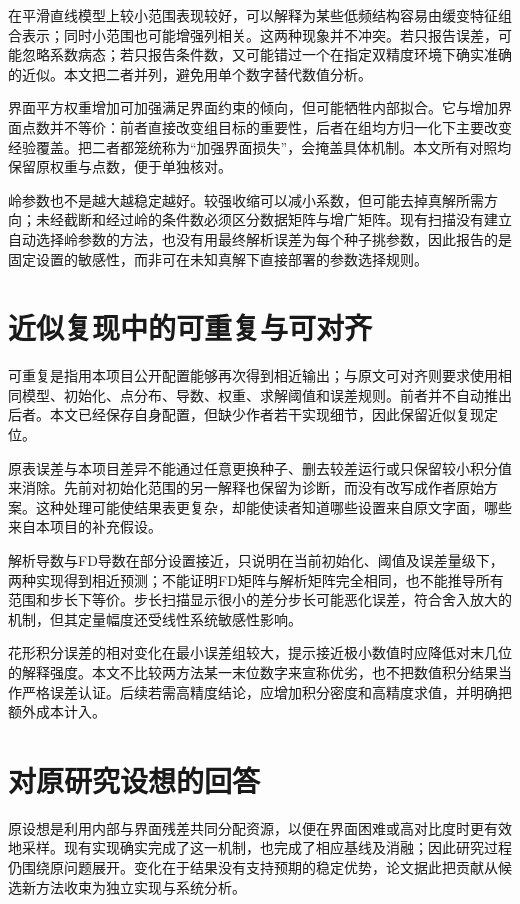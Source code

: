 在平滑直线模型上较小范围表现较好，可以解释为某些低频结构容易由缓变特征组合表示；同时小范围也可能增强列相关。这两种现象并不冲突。若只报告误差，可能忽略系数病态；若只报告条件数，又可能错过一个在指定双精度环境下确实准确的近似。本文把二者并列，避免用单个数字替代数值分析。

界面平方权重增加可加强满足界面约束的倾向，但可能牺牲内部拟合。它与增加界面点数并不等价：前者直接改变组目标的重要性，后者在组均方归一化下主要改变经验覆盖。把二者都笼统称为“加强界面损失”，会掩盖具体机制。本文所有对照均保留原权重与点数，便于单独核对。

岭参数也不是越大越稳定越好。较强收缩可以减小系数，但可能去掉真解所需方向；未经截断和经过岭的条件数必须区分数据矩阵与增广矩阵。现有扫描没有建立自动选择岭参数的方法，也没有用最终解析误差为每个种子挑参数，因此报告的是固定设置的敏感性，而非可在未知真解下直接部署的参数选择规则。

\section{近似复现中的可重复与可对齐}
可重复是指用本项目公开配置能够再次得到相近输出；与原文可对齐则要求使用相同模型、初始化、点分布、导数、权重、求解阈值和误差规则。前者并不自动推出后者。本文已经保存自身配置，但缺少作者若干实现细节，因此保留近似复现定位。

原表误差与本项目差异不能通过任意更换种子、删去较差运行或只保留较小积分值来消除。先前对初始化范围的另一解释也保留为诊断，而没有改写成作者原始方案。这种处理可能使结果表更复杂，却能使读者知道哪些设置来自原文字面，哪些来自本项目的补充假设。

解析导数与FD导数在部分设置接近，只说明在当前初始化、阈值及误差量级下，两种实现得到相近预测；不能证明FD矩阵与解析矩阵完全相同，也不能推导所有范围和步长下等价。步长扫描显示很小的差分步长可能恶化误差，符合舍入放大的机制，但其定量幅度还受线性系统敏感性影响。

花形积分误差的相对变化在最小误差组较大，提示接近极小数值时应降低对末几位的解释强度。本文不比较两方法某一末位数字来宣称优劣，也不把数值积分结果当作严格误差认证。后续若需高精度结论，应增加积分密度和高精度求值，并明确把额外成本计入。

\section{对原研究设想的回答}
原设想是利用内部与界面残差共同分配资源，以便在界面困难或高对比度时更有效地采样。现有实现确实完成了这一机制，也完成了相应基线及消融；因此研究过程仍围绕原问题展开。变化在于结果没有支持预期的稳定优势，论文据此把贡献从候选新方法收束为独立实现与系统分析。

